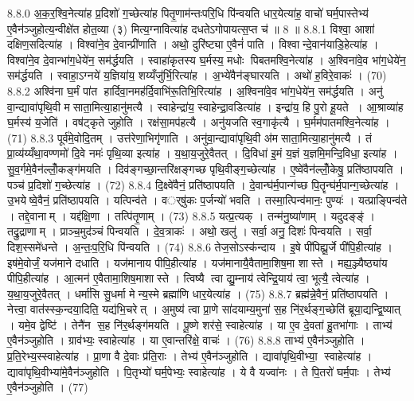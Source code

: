 8.8.0
अ॒क॒र॒श्वि॒नेत्या॑ह प्र॒दिशो॑ ग॒च्छेत्या॑ह पितृ॒णाम॑न्तःपरि॒धि पि॑न्वयति धार॒येत्या॑ह॒ वाचो॑ घर्म॒पास्तेभ्य॑ ए॒वैन॑ञ्जुहोत्य॒न्वीक्षे॑त होत॒व्या (३) मित्य॒ग्नावित्या॑ह दधतेऽगोपायत्स॒प्त च॑ ॥ 8 ॥
8.8.1
विश्वा॒ आशा॑ दक्षिण॒सदित्या॑ह । विश्वा॑ने॒व दे॒वान्प्री॑णाति । अथो॒ दुरि॑ष्ट्या ए॒वैनं॑ पाति । विश्वान्दे॒वान॑याडि॒हेत्या॑ह । विश्वा॑ने॒व दे॒वान्भा॑ग॒धेये॑न॒ सम॑र्द्धयति । स्वाहा॑कृतस्य घ॒र्मस्य॒ मधोः पिबतमश्वि॒नेत्या॑ह । अ॒श्विना॑वे॒व भा॑ग॒धेये॑न॒ सम॑र्द्धयति । स्वाहा॒ऽग्नये॑ य॒ज्ञिया॑य॒ शय्यँजु॑र्भि॒रित्या॑ह । अ॒भ्ये॑वैन॑ङ्घारयति । अथो॑ ह॒विरे॒वाकः॑ । (70)
8.8.2
अश्वि॑ना घ॒र्मं पा॑त हार्दिवा॒नमह॑र्दि॒वाभि॑रू॒तिभि॒रित्या॑ह । अ॒श्विना॑वे॒व भा॑ग॒धेये॑न॒ सम॑र्द्धयति । अनु॑ वा॒न्द्यावा॑पृथि॒वी मसाता॒मित्या॒हानु॑मत्यै । स्वाहेन्द्रा॑य॒ स्वाहेन्द्रा॒वडित्या॑ह । इन्द्रा॑य॒ हि पु॒रो हू॒यते । आ॒श्राव्या॑ह घ॒र्मस्य॑ य॒जेति॑ । वष॑ट्कृते जुहोति । रक्ष॑सा॒मप॑हत्यै । अनु॑यजति स्व॒गाकृ॑त्यै । घ॒र्मम॑पातमश्वि॒नेत्या॑ह । (71)
8.8.3
पूर्व॑मे॒वोदि॒तम् । उत्त॑रेणा॒भिगृ॑णाति । अनु॑वा॒न्द्यावा॑पृथि॒वी अ॑मसाता॒मित्या॒हानु॑मत्यै । तं प्रा॒व्य॑य्यँथा॒वण्णमो॑ दि॒वे नमः॑ पृथि॒व्या इत्या॑ह । य॒था॒य॒जुरे॒वैतत् । दि॒विधा॑ इ॒मं य॒ज्ञं य॒ज्ञमि॒मन्दि॒विधा॒ इत्या॑ह । सु॒व॒र्गमे॒वैन॑ल्लोँ॒कङ्ग॑मयति । दिव॑ङ्गच्छा॒न्तरि॑क्षङ्गच्छ पृथि॒वीङ्ग॒च्छेत्या॑ह । ए॒ष्वे॑वैन॑ल्लोँ॒केषु॒ प्रति॑ष्ठापयति । पञ्च॑ प्र॒दिशो॑ ग॒च्छेत्या॑ह । (72)
8.8.4
दि॒क्ष्वे॑वैनं॒ प्रति॑ष्ठापयति । दे॒वान्घ॑र्म॒पान्ग॑च्छ पि॒तॄन्घ॑र्म॒पान्ग॒च्छेत्या॑ह । उ॒भयेष्वे॒वैनं॒ प्रति॑ष्ठापयति । यत्पिन्व॑ते । वर््षु॑कः प॒र्जन्यो॑ भवति । तस्मा॒त्पिन्व॑मानः॒ पुण्यः॑ । यत्प्राङ्पिन्व॑ते । तद्दे॒वानाम् । यद्द॑क्षि॒णा । तत्पि॑तृ॒णाम् । (73)
8.8.5
यत्प्र॒त्यक् । तन्म॑नु॒ष्या॑णाम् । यदुदङ्ङ्॑ । तद्रु॒द्राणाम् । प्राञ्च॒मुद॑ञ्चं पिन्वयति । दे॒व॒त्राकः॑ । अथो॒ खलु॑ । सर्वा॒ अनु॒ दिशः॑ पिन्वयति । सर्वा॒ दिश॒स्समे॑धन्ते । अ॒न्तः॒प॒रि॒धि पि॑न्वयति । (74)
8.8.6
तेज॒सोऽस्क॑न्दाय । इ॒षे पी॑पिह्यू॒र्जे पी॑पि॒हीत्या॑ह । इष॑मे॒वोर्जं॒ यज॑माने दधाति । यज॑मानाय पीपि॒हीत्या॑ह । यज॑मानायै॒वैतामा॒शिष॒मा शास्ते । मह्य॒ञ्ज्यैष्ठ्या॑य पीपि॒हीत्या॑ह । आ॒त्मन॑ ए॒वैतामा॒शिष॒माशास्ते । त्विष्यै त्वा द्यु॒म्नाय॑ त्वेन्द्रि॒याय॑ त्वा॒ भूत्यै॒ त्वेत्या॑ह । य॒था॒य॒जुरे॒वैतत् । धर्मा॑सि सु॒धर्मा मेन्य॒स्मे ब्रह्मा॑णि धार॒येत्या॑ह । (75)
8.8.7
ब्रह्म॑न्ने॒वैनं॒ प्रति॑ष्ठापयति । नेत्त्वा॒ वात॑स्स्क॒न्दया॒दिति॒ यद्य॑भि॒चरेत् । अ॒मुष्य॑ त्वा प्रा॒णे सा॑दयाम्य॒मुना॑ स॒ह नि॑र॒र्थङ्ग॒च्छेति॑ ब्रूया॒द्यन्द्वि॒ष्यात् । यमे॒व द्वेष्टि॑ । तेनै॑न स॒ह नि॑र॒र्थङ्ग॑मयति । पू॒ष्णे शर॑से॒ स्वाहेत्या॑ह । या ए॒व दे॒वता॑ हु॒तभा॑गाः । ताभ्य॑ ए॒वैन॑ञ्जुहोति । ग्राव॑भ्यः॒ स्वाहेत्या॑ह । या ए॒वान्तरि॑क्षे॒ वाचः॑ । (76)
8.8.8
ताभ्य॑ ए॒वैन॑ञ्जुहोति । प्र॒ति॒रेभ्य॒स्स्वाहेत्या॑ह । प्रा॒णा वै दे॒वाः प्र॑ति॒राः । तेभ्य॑ ए॒वैन॑ञ्जुहोति । द्यावा॑पृथि॒वीभ्या॒ स्वाहेत्या॑ह । द्यावा॑पृथि॒वीभ्या॑मे॒वैन॑ञ्जुहोति । पि॒तृभ्यो॑ घर्म॒पेभ्यः॒ स्वाहेत्या॑ह । ये वै यज्वा॑नः । ते पि॒तरो॑ घर्म॒पाः । तेभ्य॑ ए॒वैन॑ञ्जुहोति । (77)
